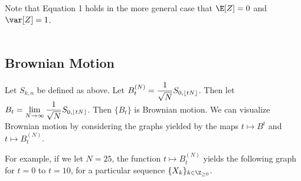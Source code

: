 Note that Equation 1 holds in the more general case that $\E[Z]=0$ and $\var[Z]=1$.\\\\

\subsection{Brownian Motion}

Let $S_{k,n}$ be defined as above.  Let $\displaystyle B_t^{(N)}=\frac{1}{\sqrt{N}}S_{0,\lfloor tN\rfloor}$.  Then let $\displaystyle B_t=\lim_{N\to\infty}\frac{1}{\sqrt{N}}S_{0,\lfloor tN\rfloor}$.  Then $\{B_t\}$ is Brownian motion.  We can visualize Brownian motion by considering the graphs yielded by the maps $t\mapsto B^t$ and $t\mapsto B_t^{(N)}$.

For example, if we let $N=25$, the function $t\mapsto B_t^{(N)}$ yields the following graph for $t=0$ to $t=10$, for a particular sequence $\{X_k\}_{k\in\Z_{\geq 0}}$.

